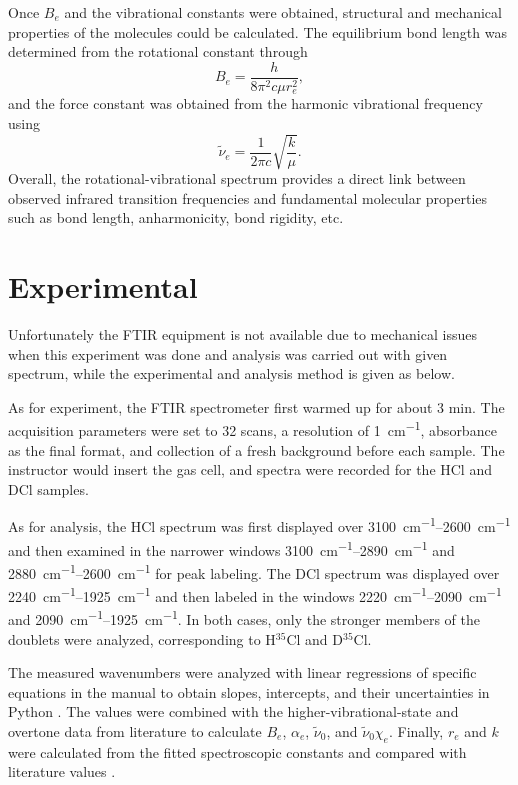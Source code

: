 \documentclass[12pt]{article}
\begin{document}
Once \(B_e\) and the vibrational constants were obtained, structural and mechanical properties of the molecules could be calculated. The equilibrium bond length was determined from the rotational constant through \cite{lab_manual}
\begin{equation}
B_e=\frac{h}{8\pi^2 c \mu r_e^2},
\end{equation}
and the force constant was obtained from the harmonic vibrational frequency using\cite{lab_manual}
\begin{equation}
\tilde{\nu}_e=\frac{1}{2\pi c}\sqrt{\frac{k}{\mu}}.
\end{equation}
Overall, the rotational-vibrational spectrum provides a direct link between observed infrared transition frequencies and fundamental molecular properties such as bond length, anharmonicity, bond rigidity, etc.

\section*{Experimental}
Unfortunately the FTIR equipment is not available due to mechanical issues when this experiment was done and analysis was carried out with given spectrum, while the experimental and analysis method is given as below.

As for experiment, the FTIR spectrometer first warmed up for about 3 min. The acquisition parameters were set to 32 scans, a resolution of \SI{1}{cm^{-1}}, absorbance as the final format, and collection of a fresh background before each sample. The instructor would insert the gas cell, and spectra were recorded for the HCl and DCl samples.

As for analysis, the HCl spectrum was first displayed over \SIrange{3100}{2600}{cm^{-1}} and then examined in the narrower windows \SIrange{3100}{2890}{cm^{-1}} and \SIrange{2880}{2600}{cm^{-1}} for peak labeling. The DCl spectrum was displayed over \SIrange{2240}{1925}{cm^{-1}} and then labeled in the windows \SIrange{2220}{2090}{cm^{-1}} and \SIrange{2090}{1925}{cm^{-1}}. In both cases, only the stronger members of the doublets were analyzed, corresponding to H\(^{35}\)Cl and D\(^{35}\)Cl.

The measured wavenumbers were analyzed with linear regressions of specific equations in the manual \cite{lab_manual} to obtain slopes, intercepts, and their uncertainties in Python \cite{reback2020pandas,harris2020array,2020SciPy}. The values were combined with the higher-vibrational-state and overtone data from literature \cite{sime1990lit_all} to calculate \(B_e\), \(\alpha_e\), \(\tilde{\nu}_0\), and \(\tilde{\nu}_0\chi_e\). Finally, \(r_e\) and \(k\) were calculated from the fitted spectroscopic constants and compared with literature values \cite{herzberg2013bond_lit,lide2002constant_lit}.
\end{document}
